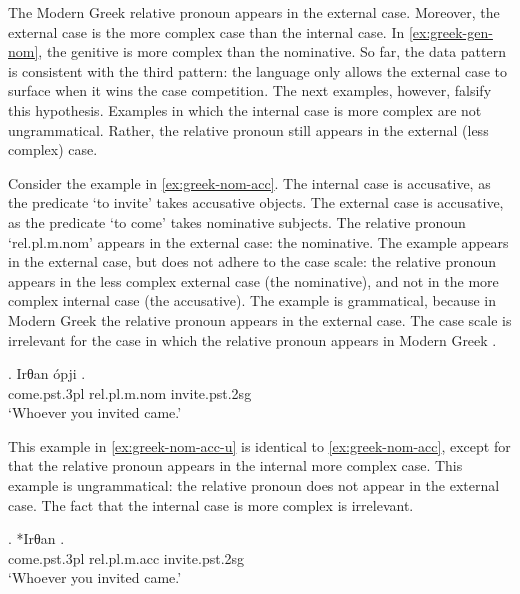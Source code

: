 The Modern Greek relative pronoun appears in the external case. Moreover, the external case is the more complex case than the internal case. In \ref{ex:greek-gen-nom}, the genitive is more complex than the nominative.
So far, the data pattern is consistent with the third pattern: the language only allows the external case to surface when it wins the case competition. The next examples, however, falsify this hypothesis. Examples in which the internal case is more complex are not ungrammatical. Rather, the relative pronoun still appears in the external (less complex) case.




Consider the example in \ref{ex:greek-nom-acc}.
The internal case is accusative, as the predicate  `to invite' takes accusative objects.
The external case is accusative, as the predicate  `to come' takes nominative subjects.
The relative pronoun  `\ac{rel}.\ac{pl}.\ac{m}.\ac{nom}' appears in the external case: the nominative.
The example appears in the external case, but does not adhere to the case scale: the relative pronoun appears in the less complex external  case (the nominative), and not in the more complex internal case (the accusative).
The example is grammatical, because in Modern Greek the relative pronoun appears in the external case. The case scale is irrelevant for the case in which the relative pronoun appears in Modern Greek .

\exg. Irθan ópji .\\
come.\ac{pst}.3\ac{pl} \ac{rel}.\ac{pl}.\ac{m}.\ac{nom} invite.\ac{pst}.2\ac{sg}\\
`Whoever you invited came.'\label{ex:greek-nom-acc}

This example in \ref{ex:greek-nom-acc-u} is identical to \ref{ex:greek-nom-acc}, except for that the relative pronoun appears in the internal  more complex case. This example is ungrammatical: the relative pronoun does not appear in the external case. The fact that the internal case is more complex is irrelevant.

\exg. *Irθan  .\\
come.\ac{pst}.3\ac{pl} \ac{rel}.\ac{pl}.\ac{m}.\ac{acc} invite.\ac{pst}.2\ac{sg}\\
`Whoever you invited came.'\label{ex:greek-nom-acc-u}

